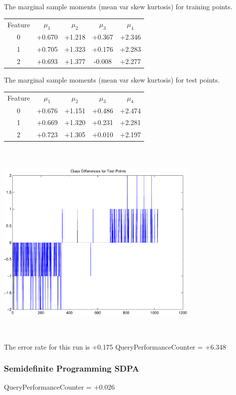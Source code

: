 \documentclass[9pt]{article}
\theoremstyle{plain}
\theoremstyle{definition}
\theoremstyle{remark}
\numberwithin{equation}{section}
\begin{document}
The marginal sample moments (mean var skew kurtosis) for training points.\newline
\begin{tabular}{ c |  c  c  c  c}
Feature & $\mu_1$ & $\mu_2$ & $\mu_3$ & $\mu_4$ \\
0 & +0.670 & +1.218 & +0.367& +2.346 \\
\hline
1 & +0.705 & +1.323 & +0.176& +2.283 \\
\hline
2 & +0.693 & +1.377 & -0.008& +2.277 \\
\hline
\end{tabular}
\newline
The marginal sample moments (mean var skew kurtosis) for test points.\newline
\begin{tabular}{ c | c  c  c  c}
Feature & $\mu_1$ & $\mu_2$ & $\mu_3$ & $\mu_4$ \\
0 & +0.676 & +1.151 & +0.486& +2.474\\
\hline
1 & +0.669 & +1.320 & +0.231& +2.281\\
\hline
2 & +0.723 & +1.305 & +0.010& +2.197\\
\hline
\end{tabular}\newline
\includegraphics[width=10.0cm,height=10.0cm]{classDiffs.pdf}

The error rate for this run is +0.175\newline
QueryPerformanceCounter  =  +6.348
\subsubsection{Semidefinite Programming SDPA}
QueryPerformanceCounter  =  +0.026
\end{document}
